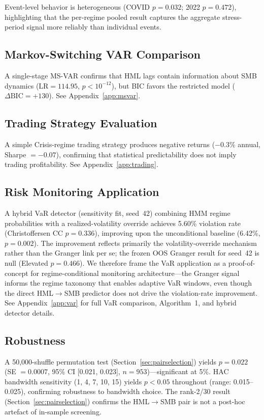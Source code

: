 \documentclass[sigconf,anonymous]{acmart}
\begin{document}
Event-level behavior is heterogeneous (COVID $p = 0.032$; 2022 $p = 0.472$),
highlighting that the per-regime pooled result captures the aggregate
stress-period signal more reliably than individual events.

\subsection{Markov-Switching VAR Comparison}
\label{sec:msvar}
A single-stage MS-VAR confirms that HML lags contain information about SMB dynamics ($\text{LR} = 114.95$, $p < 10^{-12}$), but BIC favors the restricted model ($\Delta\text{BIC} = +130$). See Appendix~\ref{app:msvar}.

\subsection{Trading Strategy Evaluation}
\label{sec:trading}
A simple Crisis-regime trading strategy produces negative returns ($-0.3\%$ annual, Sharpe $= -0.07$), confirming that statistical predictability does not imply trading profitability. See Appendix~\ref{app:trading}.

\subsection{Risk Monitoring Application}
\label{sec:risk_monitoring}
A hybrid VaR detector (sensitivity fit, seed~42) combining HMM regime probabilities with a realized-volatility override achieves 5.60\% violation rate (Christoffersen CC $p = 0.336$), improving upon the unconditional baseline (6.42\%, $p = 0.002$). The improvement reflects primarily the volatility-override mechanism rather than the Granger link per se; the frozen OOS Granger result for seed~42 is null (Elevated $p = 0.466$). We therefore frame the VaR application as a proof-of-concept for regime-conditional monitoring architecture---the Granger signal informs the regime taxonomy that enables adaptive VaR windows, even though the direct HML$\to$SMB predictor does not drive the violation-rate improvement. See Appendix~\ref{app:var} for full VaR comparison, Algorithm~1, and hybrid detector details.

\subsection{Robustness}
\label{sec:robustness}

A 50{,}000-shuffle permutation test (Section~\ref{sec:pairselection}) yields
$p = 0.022$ (SE $= 0.0007$, 95\% CI [0.021, 0.023], $n = 953$)---significant at 5\%.
HAC bandwidth sensitivity (1, 4, 7, 10, 15) yields $p < 0.05$ throughout
(range: 0.015--0.025), confirming robustness to bandwidth choice.
The rank-2/30 result (Section~\ref{sec:pairselection}) confirms the
HML$\to$SMB pair is not a post-hoc artefact of in-sample screening.
\end{document}
